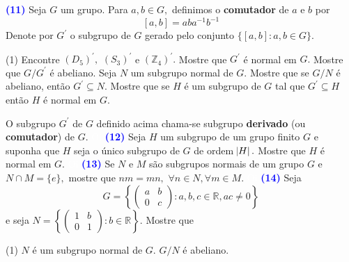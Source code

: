 \documentclass[12pt, a4paper]{article}
\newcommand{\negrito}[1]{\mbox{\boldmath{$#1$}}}
\begin{document}
\textcolor{blue}{\bf(11)}\label{49} Seja $G$ um grupo. Para $a,b \in G,$ definimos o \textbf{comutador} de $a$ e $b$ por
\[
[a,b] = aba^{-1}b^{-1}
\]
Denote por $G^{\prime}$ o subgrupo de $G$ gerado pelo conjunto $\{[a,b] : a,b \in G \}.$
\begin{tasks}[counter-format={(tsk[a])},label-width=3.6ex, label-format = {\bfseries}, column-sep = {0pt}](1)
\task[\textcolor{Floresta}{$\negrito{(a)} $}] Encontre $(D_5)^{\prime},$ $(S_3)^{\prime}$ e $(\mathbb{Z}_4)^{\prime}.$
\task[\textcolor{Floresta}{$\negrito{(b)} $}] Mostre que $G^{\prime}$ é normal em $G.$
\task[\textcolor{Floresta}{$\negrito{(c)} $}] Mostre que $G/G^{\prime}$ é abeliano.
\task[\textcolor{Floresta}{$\negrito{(d)} $}] Seja $N$ um subgrupo normal de $G.$ Mostre que se $G/N$ é abeliano, então $G^{\prime} \subseteq N.$
\task[\textcolor{Floresta}{$\negrito{(e)} $}] Mostre que se $H$ é um subgrupo de $G$ tal que $G^{\prime} \subseteq H$ então $H$ é normal em $G.$
\end{tasks}
O subgrupo $G^{\prime}$ de $G$ definido acima chama-se subgrupo \textbf{derivado} (ou \textbf{comutador}) de $G.$ 
\textcolor{white}{Oi}\newline\newline
\textcolor{blue}{\bf(12)}\label{50} Seja $H$ um subgrupo de um grupo finito $G$ e suponha que $H$ seja o único subgrupo de $G$ de ordem $\abs{H}.$ Mostre que $H$ é normal em $G.$
\textcolor{white}{Oi}\newline\newline
\textcolor{blue}{\bf(13)}\label{51}  Se  $N$ e $M$ são subgrupos normais de um grupo $G$ e $N \cap M = \{e\},$ mostre que $nm = mn,$ $\forall n \in N, \forall m \in M.$
\textcolor{white}{Oi}\newline\newline
\textcolor{blue}{\bf(14)}\label{52} Seja 
\[
G = \left\{ \left(\begin{array}{cc} a & b \\ 0 & c \end{array}\right): a,b,c \in \mathbb{R}, ac \neq 0 \right\}
\]
e seja $N = \left\{ \left(\begin{array}{cc} 1 & b \\ 0 & 1 \end{array}\right) : b \in \mathbb{R} \right\}.$ Mostre que
\begin{tasks}[counter-format={(tsk[a])},label-width=3.6ex, label-format = {\bfseries}, column-sep = {0pt}](1)
\task[\textcolor{Floresta}{$\negrito{(a)} $}] $N$ é um subgrupo normal de $G.$
\task[\textcolor{Floresta}{$\negrito{(b)} $}] $G/N$ é abeliano.
\end{tasks}
\end{document}
